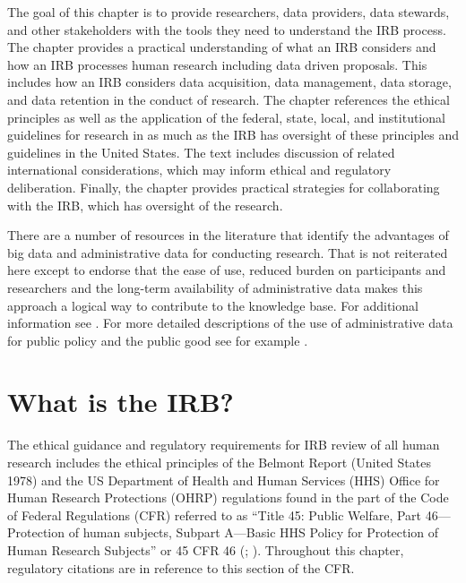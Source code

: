 The goal of this chapter is to provide researchers, data providers, data stewards, and other stakeholders with the tools they need to understand the IRB process. The chapter provides a practical understanding of what an IRB considers and how an IRB processes human research including data driven proposals. This includes how an IRB considers data acquisition, data management, data storage, and data retention in the conduct of research. The chapter references the ethical principles as well as the application of the federal, state, local, and institutional guidelines for research in as much as the IRB has oversight of these principles and guidelines in the United States. The text includes discussion of related international considerations, which may inform ethical and regulatory deliberation. Finally, the chapter provides practical strategies for collaborating with the IRB, which has oversight of the research.

There are a number of resources in the literature that identify the advantages of big data and administrative data for conducting research. That is not reiterated here except to endorse that the ease of use, reduced burden on participants and researchers and the long-term availability of administrative data makes this approach a logical way to contribute to the knowledge base. For additional information see \citep{feeney2015, connelly2016, collmann2016}. For more detailed descriptions of the use of administrative data for public policy and the public good see for example \citep{card2010, collmann2016, figlio2016}.

\hypertarget{what-is-the-irb}{%
\section{What is the IRB?}\label{what-is-the-irb}}

The ethical guidance and regulatory requirements for IRB review of all human research includes the ethical principles of the Belmont Report (United States 1978) and the US Department of Health and Human Services (HHS) Office for Human Research Protections (OHRP) regulations found in the part of the Code of Federal Regulations (CFR) referred to as ``Title 45: Public Welfare, Part 46---Protection of human subjects, Subpart A---Basic HHS Policy for Protection of Human Research Subjects'' or 45 CFR 46 (\citet{codeoffederalregulations2017c}; \citet{officeforhumanresearchprotections2016}). Throughout this chapter, regulatory citations are in reference to this section of the CFR.


